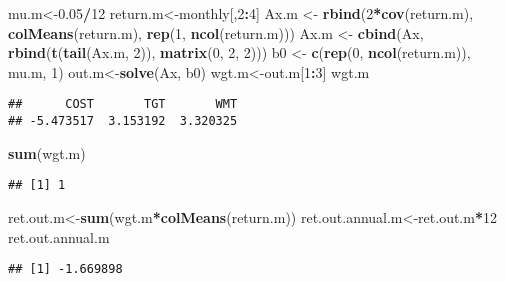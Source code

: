 \documentclass[]{article}
\newenvironment{Shaded}{\begin{snugshade}}{\end{snugshade}}
\newcommand{\DecValTok}[1]{\textcolor[rgb]{0.00,0.00,0.81}{#1}}
\newcommand{\FloatTok}[1]{\textcolor[rgb]{0.00,0.00,0.81}{#1}}
\newcommand{\KeywordTok}[1]{\textcolor[rgb]{0.13,0.29,0.53}{\textbf{#1}}}
\newcommand{\NormalTok}[1]{#1}
\newcommand{\OperatorTok}[1]{\textcolor[rgb]{0.81,0.36,0.00}{\textbf{#1}}}
\newcommand{\StringTok}[1]{\textcolor[rgb]{0.31,0.60,0.02}{#1}}
\begin{document}
\begin{Shaded}
\begin{Highlighting}[]
\NormalTok{mu.m<-}\FloatTok{0.05}\OperatorTok{/}\DecValTok{12}
\NormalTok{return.m<-monthly[,}\DecValTok{2}\OperatorTok{:}\DecValTok{4}\NormalTok{]}
\NormalTok{Ax.m <-}\StringTok{ }\KeywordTok{rbind}\NormalTok{(}\DecValTok{2}\OperatorTok{*}\KeywordTok{cov}\NormalTok{(return.m), }\KeywordTok{colMeans}\NormalTok{(return.m), }\KeywordTok{rep}\NormalTok{(}\DecValTok{1}\NormalTok{, }\KeywordTok{ncol}\NormalTok{(return.m)))}
\NormalTok{Ax.m <-}\StringTok{ }\KeywordTok{cbind}\NormalTok{(Ax, }\KeywordTok{rbind}\NormalTok{(}\KeywordTok{t}\NormalTok{(}\KeywordTok{tail}\NormalTok{(Ax.m, }\DecValTok{2}\NormalTok{)), }\KeywordTok{matrix}\NormalTok{(}\DecValTok{0}\NormalTok{, }\DecValTok{2}\NormalTok{, }\DecValTok{2}\NormalTok{)))}
\NormalTok{b0 <-}\StringTok{ }\KeywordTok{c}\NormalTok{(}\KeywordTok{rep}\NormalTok{(}\DecValTok{0}\NormalTok{, }\KeywordTok{ncol}\NormalTok{(return.m)), mu.m, }\DecValTok{1}\NormalTok{)}
\NormalTok{out.m<-}\KeywordTok{solve}\NormalTok{(Ax, b0)}
\NormalTok{wgt.m<-out.m[}\DecValTok{1}\OperatorTok{:}\DecValTok{3}\NormalTok{]}
\NormalTok{wgt.m}
\end{Highlighting}
\end{Shaded}

\begin{verbatim}
##      COST       TGT       WMT 
## -5.473517  3.153192  3.320325
\end{verbatim}

\begin{Shaded}
\begin{Highlighting}[]
\KeywordTok{sum}\NormalTok{(wgt.m)}
\end{Highlighting}
\end{Shaded}

\begin{verbatim}
## [1] 1
\end{verbatim}

\begin{Shaded}
\begin{Highlighting}[]
\NormalTok{ret.out.m<-}\KeywordTok{sum}\NormalTok{(wgt.m}\OperatorTok{*}\KeywordTok{colMeans}\NormalTok{(return.m))}
\NormalTok{ret.out.annual.m<-ret.out.m}\OperatorTok{*}\DecValTok{12}
\NormalTok{ret.out.annual.m}
\end{Highlighting}
\end{Shaded}

\begin{verbatim}
## [1] -1.669898
\end{verbatim}
\end{document}
